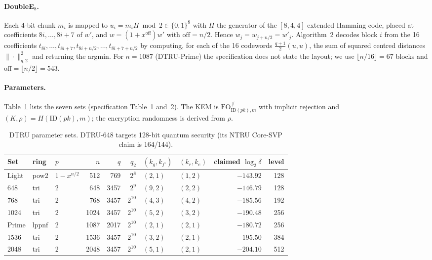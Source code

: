 \documentclass[11pt,a4paper]{article}
\theoremstyle{definition}
\theoremstyle{remark}
\newcommand{\ID}{\mathrm{ID}}
\newcommand{\dfr}{\delta}
\begin{document}
\paragraph{DoubleE$_8$.}
Each 4-bit chunk $m_i$ is mapped to $u_i=m_iH\bmod 2\in\{0,1\}^8$ with $H$
the generator of the $[8,4,4]$ extended Hamming code, placed at coefficients
$8i,\dots,8i+7$ of $w'$, and $w=(1+x^{\mathrm{off}})w'$ with
$\mathrm{off}=n/2$. Hence $w_j=w_{j+n/2}=w'_j$. Algorithm~2 decodes block
$i$ from the 16 coefficients $t_{8i},\dots,t_{8i+7},t_{8i+n/2},\dots,t_{8i+7+n/2}$
by computing, for each of the 16 codewords $\tfrac{q+1}{2}(u,u)$, the sum
of squared centred distances $\|\cdot\|_{q,2}^2$ and returning the argmin.
For $n=1087$ (DTRU-Prime) the specification does not state the layout; we
use $\lfloor n/16\rfloor=67$ blocks and $\mathrm{off}=\lfloor n/2\rfloor=543$.

\paragraph{Parameters.}
Table~\ref{tab:params} lists the seven sets (specification Table~1 and~2).
The KEM is $\mathrm{FO}^{\not\perp}_{\ID(pk),m}$ with implicit rejection and
$(K,\rho)=H(\ID(pk),m)$; the encryption randomness is derived from $\rho$.

\begin{table}[t]
\centering\small
\begin{tabular}{lllrrrllrr}
\toprule
Set & ring & $p$ & $n$ & $q$ & $q_2$ & $(k_g,k_{f'})$ & $(k_r,k_e)$ & claimed $\log_2\dfr$ & level\\
\midrule
Light & pow2 & $1-x^{n/2}$ & 512 & 769 & $2^8$ & $(2,1)$ & $(1,2)$ & $-143.92$ & 128\\
648 & tri & 2 & 648 & 3457 & $2^9$ & $(9,2)$ & $(2,2)$ & $-146.79$ & 128\\
768 & tri & 2 & 768 & 3457 & $2^{10}$ & $(4,3)$ & $(4,2)$ & $-185.56$ & 192\\
1024 & tri & 2 & 1024 & 3457 & $2^{10}$ & $(5,2)$ & $(3,2)$ & $-190.48$ & 256\\
Prime & lppnf & 2 & 1087 & 2017 & $2^{10}$ & $(2,1)$ & $(2,1)$ & $-180.72$ & 256\\
1536 & tri & 2 & 1536 & 3457 & $2^{10}$ & $(3,2)$ & $(2,1)$ & $-195.50$ & 384\\
2048 & tri & 2 & 2048 & 3457 & $2^{10}$ & $(5,1)$ & $(2,1)$ & $-204.10$ & 512\\
\bottomrule
\end{tabular}
\caption{DTRU parameter sets. DTRU-648 targets 128-bit quantum security
(its NTRU Core-SVP claim is 164/144).}
\label{tab:params}
\end{table}
\end{document}
